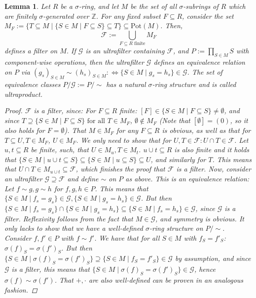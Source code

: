 \documentclass{article}
\def\Z{\mathbb{Z}}
\def\s{\sigma}
\def\fa{\text{ for all }}
\theoremstyle{plain}
\newtheorem{lem}[Satz]{Lemma}
\theoremstyle{definition}
\begin{document}
\begin{lem}\label{lemmafilters}
Let $R$ be a $\s$-ring, and let $M$ be the set of all $\s$-subrings of $R$ which are finitely $\s$-generated over $\Z$. For any fixed subset $F \subseteq R$, consider the set $M_F:= \{ T \subseteq M \mid \{S \in M \mid F \subseteq S \} \subseteq T \} \subseteq \text{Pot}(M)$. 
Then, \[ \mathcal{F}:= \bigcup_{ F \subseteq R \text{ finite} } M_F \]
 defines a filter on $M$. If $\mathcal{G}$ is an ultrafilter containing $\mathcal{F}$, and $P:= \prod_{S \in M} S$ with component-wise operations,
 then the ultrafilter $\mathcal{G}$ defines an equivalence relation on $P$ via $(g_s)_{S \in M} \sim (h_s)_{S \in M} : \Leftrightarrow \{ S \in M \mid g_s = h_s \} \in \mathcal{G}$. 
The set of equivalence classes $P/\mathcal{G}:= P/\sim$ has a natural $\s$-ring structure and is called ultraproduct. %
\begin{proof}
$\mathcal{F}$ is a filter, since: 
  For $F \subseteq R$ finite: $[F] \in \{ S \in M \mid F \subseteq S \} \neq \emptyset$, and since $T \supseteq \{ S \in M \mid F \subseteq S \} \fa T \in M_F$, $\emptyset \notin M_F$ (Note that $[\emptyset] = (0)$, so it also holds for $F = \emptyset$).
  That $M \in M_F$ for any $F \subseteq R$ is obvious, as well as that for $T \subseteq U, T \in M_F$, $U \in M_F$. We only need to show that for $U,T \in \mathcal{F}: U \cap T \in \mathcal{F}$.
  Let $u, t \subseteq R$ be finite, such, that $U \in M_u, T \in M_t$. $u \cup t \subseteq R$ is also finite and it holds that  $\{ S \in M \mid u \cup t \subseteq S \} \subseteq \{ S \in M \mid u \subseteq S \} \subseteq U$,
 and similarly for $T$. This means that $U \cap T \in M_{u \cup t} \subseteq \mathcal{F}$, which finishes the proof that $\mathcal{F}$ is a filter.
 Now, consider an ultrafilter $\mathcal{G} \supseteq \mathcal{F}$ and define $\sim$ on $P$ as above. This is an equivalence relation: Let $f \sim g, g \sim h$ for $f,g,h \in P$. 
 This means that $\{ S \in M \mid f_s = g_s \} \in \mathcal{G}, \{ S \in M \mid g_s = h_s \} \in \mathcal{G}$. But then $\{ S \in M \mid f_s = g_s \} \cap \{ S \in M \mid g_s = h_s \} \subseteq \{ S \in M \mid f_s = h_s \} \in \mathcal{G}$, since $\mathcal{G}$ is a filter.
 Reflexivity follows from the fact that $M \in \mathcal{G}$, and symmetry is obvious. It only lacks to show that we have a well-defined $\s$-ring structure on $P/\sim$.
 Consider $f,f' \in P$ with $f \sim f'$. We have that for all $S \in M$ with $f_S = f'_S$:  $\sigma(f)_S = \sigma(f')_S$. 
 But then $\{ S \in M \mid \s(f)_S = \s(f')_S \} \supseteq \{ S \in M \mid f_S = f'_S \} \in \mathcal{G}$ by assumption, and since $\mathcal{G}$ is a filter, this means that $\{ S \in M \mid \s(f)_S = \s(f')_S \} \in \mathcal{G}$,
 hence $\s(f) \sim \s(f')$. That $+, \cdot$ are also well-defined can be proven in an analogous fashion.
\end{proof}
\end{lem}
\end{document}
